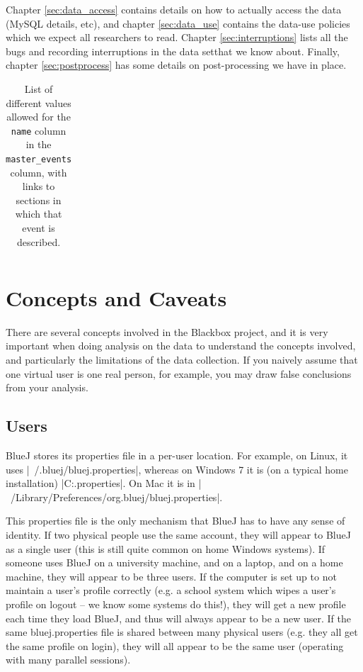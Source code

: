\documentclass{report}
\begin{document}
Chapter \ref{sec:data_access} contains details on how to actually access the
data (MySQL details, etc), and chapter \ref{sec:data_use} contains the
data-use policies which we expect all researchers to read.  Chapter \ref{sec:interruptions}
lists all the bugs and recording interruptions in the data setthat we know about.
Finally, chapter \ref{sec:postprocess} has some details on
post-processing we have in place.

\vspace{3cm}

\begingroup
\let\clearpage\relax
\tableofcontents
\endgroup

\listoftables

\clearpage
\begin{longtable}{p{6cm}@{}l}
\caption[Possible \lstinline!master_events.name! values]{List of different
  values allowed for the \lstinline!name! column in the \lstinline!master_events! column, with
  links to sections in which that event is described.}\label{tab:event_names}\\
\end{longtable}

\chapter{Concepts and Caveats}
\label{sec:concepts}

There are several concepts involved in the Blackbox project, and it is
very important when doing analysis on the data to understand the concepts
involved, and particularly the limitations of the data collection.  If you
naively assume that one virtual user is one real person, for example, you may draw false
conclusions from your analysis.

\section{Users}
\label{def:users}

BlueJ stores its properties file in a per-user location.  For example, on
Linux, it uses |~/.bluej/bluej.properties|, whereas on Windows 7 it is (on a typical
home installation) |C:\Users\Joe\bluej\bluej.properties|.  On Mac it is in
|~/Library/Preferences/org.bluej/bluej.properties|.

This properties file is the only mechanism that BlueJ has to have any sense of
identity.  If two physical people use the same account, they will appear to
BlueJ as a single user (this is still quite common on home Windows systems).
If someone uses BlueJ on a university machine, and on a laptop, and on a home
machine, they will appear to be three users.
If the computer is set up to not maintain a user's profile correctly (e.g. a
school system which wipes a user's profile on logout -- we know some systems
do this!), they will get a new profile each time they load BlueJ, and thus
will always appear to be a new user.  If the same bluej.properties file is
shared between many physical users (e.g. they all get the same profile on
login), they will all appear to be the same user (operating with many parallel sessions).
\end{document}
